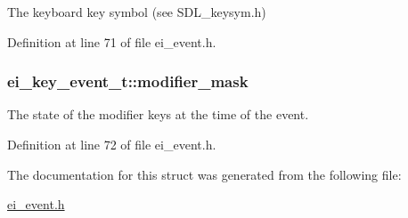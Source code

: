 The keyboard key symbol (see S\-D\-L\-\_\-keysym.\-h) 



Definition at line 71 of file ei\-\_\-event.\-h.

\hypertarget{structei__key__event__t_a35e4dc6d788b9fdd4eeedf716662afab}{
\subsubsection[{modifier\-\_\-mask}]{ ei\-\_\-key\-\_\-event\-\_\-t\-::modifier\-\_\-mask}}\label{structei__key__event__t_a35e4dc6d788b9fdd4eeedf716662afab}


The state of the modifier keys at the time of the event. 



Definition at line 72 of file ei\-\_\-event.\-h.



The documentation for this struct was generated from the following file\-:\begin{DoxyCompactItemize}
\item 
\hyperlink{ei__event_8h}{ei\-\_\-event.\-h}\end{DoxyCompactItemize}

